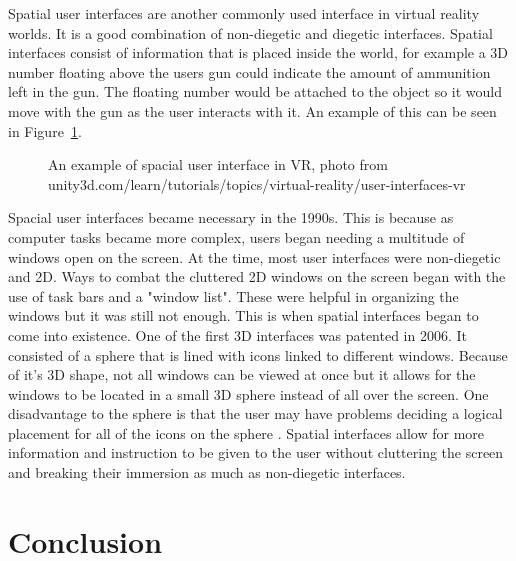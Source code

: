 Spatial user interfaces are another commonly used interface in virtual reality worlds. It is a good combination of non-diegetic and diegetic interfaces. Spatial interfaces consist of information that is placed inside the world, for example a 3D number floating above the users gun could indicate the amount of ammunition left in the gun. The floating number would be attached to the object so it would move with the gun as the user interacts with it. An example of this can be seen in Figure~\ref{fig:spatialUI}.
\begin{figure}[!ht]
	\begin{center}
	\end{center}
	\caption{An example of spacial user interface in VR, photo from unity3d.com/learn/tutorials/topics/virtual-reality/user-interfaces-vr} \label{fig:spatialUI}
\end{figure}
Spacial user interfaces became necessary in the 1990s. This is because as computer tasks became more complex, users began needing a multitude of windows open on the screen. At the time, most user interfaces were non-diegetic and 2D. Ways to combat the cluttered 2D windows on the screen began with the use of task bars and a "window list". These were helpful in organizing the windows but it was still not enough. This is when spatial interfaces began to come into existence. One of the first 3D interfaces was patented in 2006. It consisted of a sphere that is lined with icons linked to different windows. Because of it's 3D shape, not all windows can be viewed at once but it allows for the windows to be located in a small 3D sphere instead of all over the screen. One disadvantage to the sphere is that the user may have problems deciding a logical placement for all of the icons on the sphere \cite{Roca2006}. Spatial interfaces allow for more information and instruction to be given to the user without cluttering the screen and breaking their immersion as much as non-diegetic interfaces.

\section{Conclusion}


